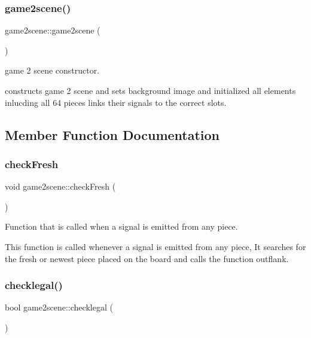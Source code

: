 \subsubsection{\texorpdfstring{game2scene()}{game2scene()}}
{\footnotesize\ttfamily game2scene\+::game2scene (\begin{DoxyParamCaption}{ }\end{DoxyParamCaption})}



game 2 scene constructor. 

constructs game 2 scene and sets background image and initialized all elements inlucding all 64 pieces links their signals to the correct slots. 

\subsection{Member Function Documentation}
\mbox{\label{classgame2scene_a9ff06546f203c57909aaeb36063fc206}} 
\subsubsection{\texorpdfstring{check\+Fresh}{checkFresh}}
{\footnotesize\ttfamily void game2scene\+::check\+Fresh (\begin{DoxyParamCaption}{ }\end{DoxyParamCaption})\hspace{0.3cm}{\ttfamily [slot]}}



Function that is called when a signal is emitted from any piece. 

This function is called whenever a signal is emitted from any piece, It searches for the fresh or newest piece placed on the board and calls the function outflank. \mbox{\label{classgame2scene_ae58d542526a191cf327675b83694f4ec}} 
\subsubsection{\texorpdfstring{checklegal()}{checklegal()}}
{\footnotesize\ttfamily bool game2scene\+::checklegal (\begin{DoxyParamCaption}{ }\end{DoxyParamCaption})}



